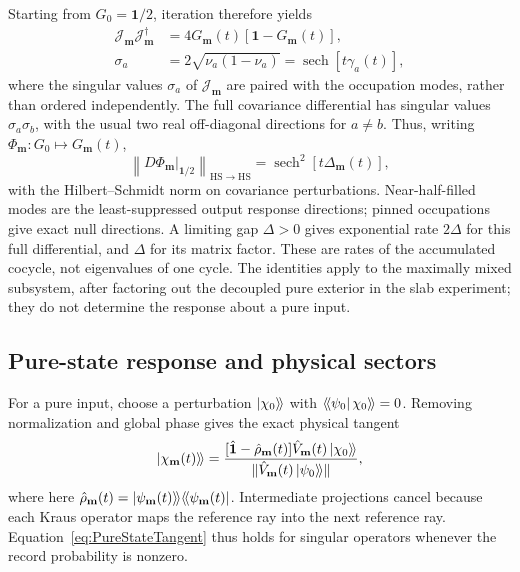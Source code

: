\documentclass[aps,prb,10pt,twocolumn,superscriptaddress,longbibliography,floatfix]{revtex4-2}
\newcommand{\kett}[1]{\ket{#1}\!\rangle}
\newcommand{\braa}[1]{\langle\!\bra{#1}}
\newcommand{\rec}{\mathbf m}   %
\begin{document}
{Starting from $G_0=\mathbf1/2$, iteration therefore yields
\begin{align}
 \mathcal J_{\rec}\mathcal J_{\rec}^\dagger
 &=4G_{\rec}(t)[\mathbf1-G_{\rec}(t)],\nonumber\\
 \sigma_a&=2\sqrt{\nu_a(1-\nu_a)}
 =\operatorname{sech}[t\gamma_a(t)],
 \label{eq:MaxmixTangentSpectrum}
\end{align}
where the singular values $\sigma_a$ of $\mathcal J_{\rec}$ are paired with the occupation modes, rather than ordered independently. The full covariance differential has singular values $\sigma_a\sigma_b$, with the usual two real off-diagonal directions for $a\ne b$. Thus, writing $\Phi_{\rec}:G_0\mapsto G_{\rec}(t)$,
\begin{equation}
 \left\|D\Phi_{\rec}\big|_{\mathbf1/2}\right\|_{\mathrm{HS}\to\mathrm{HS}}
 =\operatorname{sech}^{2}[t\Delta_{\rec}(t)],
 \label{eq:MaxmixTangentNorm}
\end{equation}
with the Hilbert--Schmidt norm on covariance perturbations. Near-half-filled modes are the least-suppressed output response directions; pinned occupations give exact null directions. A limiting gap $\Delta>0$ gives exponential rate $2\Delta$ for this full differential, and $\Delta$ for its matrix factor. These are rates of the accumulated cocycle, not eigenvalues of one cycle. The identities apply to the maximally mixed subsystem, after factoring out the decoupled pure exterior in the slab experiment; they do not determine the response about a pure input.

\subsection{Pure-state response and physical sectors}
\label{app:PureTrajectoryResponse}
For a pure input, choose a perturbation $\kett{\chi_0}$ with $\braa{\psi_0}\chi_0\rangle\!\rangle=0$. Removing normalization and global phase gives the exact physical tangent
\begin{equation}
 \kett{\chi_{\rec}(t)}=
 \frac{[\hat{\mathbf1}-\hat\rho_{\rec}(t)]\hat V_{\rec}(t)\kett{\chi_0}}
 {\|\hat V_{\rec}(t)\kett{\psi_0}\|},
 \label{eq:PureStateTangent}
\end{equation}
where here $\hat\rho_{\rec}(t)=\kett{\psi_{\rec}(t)}\braa{\psi_{\rec}(t)}$. Intermediate projections cancel because each Kraus operator maps the reference ray into the next reference ray. Equation~\eqref{eq:PureStateTangent} thus holds for singular operators whenever the record probability is nonzero.

}
\end{document}
